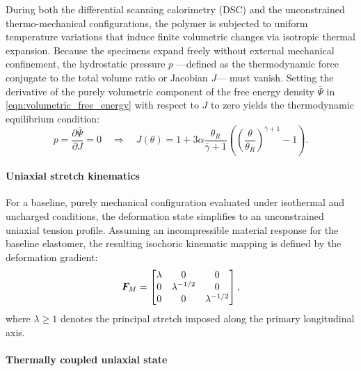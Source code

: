 During both the differential scanning calorimetry (DSC) and the unconstrained thermo-mechanical configurations, the polymer is subjected to uniform temperature variations that induce finite volumetric changes via isotropic thermal expansion. Because the specimens expand freely without external mechanical confinement, the hydrostatic pressure $p$ —defined as the thermodynamic force conjugate to the total volume ratio or Jacobian $J$— must vanish. Setting the derivative of the purely volumetric component of the free energy density $\bar{\Psi}$ in \eqref{eqn:volumetric_free_energy} with respect to $J$ to zero yields the thermodynamic equilibrium condition:
%
\begin{equation} \label{eqn:thermal_Jacobian}
    p = \frac{\partial\bar\Psi}{\partial J} = 0 \quad\Longrightarrow\quad
    J(\theta) = 1 + 3\alpha\frac{\theta_R}{\bar\gamma+1}
    \left(\left(\frac{\theta}{\theta_R}\right)^{\bar\gamma+1} - 1\right).
\end{equation}


\paragraph{Uniaxial stretch kinematics}

For a baseline, purely mechanical configuration evaluated under isothermal and uncharged conditions, the deformation state simplifies to an unconstrained uniaxial tension profile. Assuming an incompressible material response for the baseline elastomer, the resulting isochoric kinematic mapping is defined by the deformation gradient:
%
\begin{equation}
  \boldsymbol{F}_M = \begin{bmatrix}
    \lambda & 0 & 0 \\
    0 & \lambda^{-1/2} & 0 \\
    0 & 0 & \lambda^{-1/2}
  \end{bmatrix},
\end{equation}
%
where $\lambda \ge 1$ denotes the principal stretch imposed along the primary longitudinal axis.


\paragraph{Thermally coupled uniaxial state}

